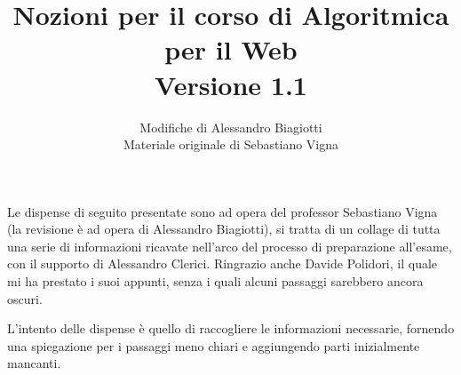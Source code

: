 \documentclass{article}
\title{
    Nozioni per il corso di Algoritmica per il Web\\
    \large{Versione 1.1}
}
\author{\large{Modifiche di Alessandro Biagiotti}\\[1ex]
    \large{Materiale originale di Sebastiano Vigna}
  }
\date{}
\begin{document}
\maketitle
\clearpage
\tableofcontents
\clearpage
\noindent Le dispense di seguito presentate sono ad opera del professor Sebastiano Vigna (la
revisione è ad opera di Alessandro Biagiotti), si tratta di un collage di tutta una serie di
informazioni ricavate nell'arco del processo di preparazione all'esame, con il supporto di
Alessandro Clerici. Ringrazio anche Davide Polidori, il quale mi ha prestato i suoi appunti, senza i
quali alcuni passaggi sarebbero ancora oscuri.

L'intento delle dispense è quello di raccogliere le informazioni necessarie, fornendo una spiegazione per i passaggi meno chiari e aggiungendo parti inizialmente mancanti.



\end{document}
